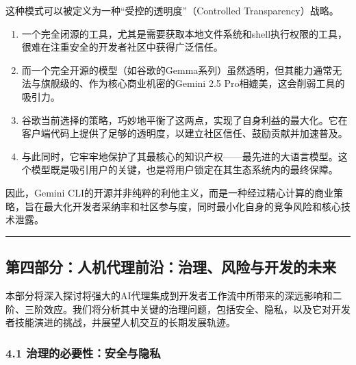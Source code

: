 \documentclass[a4paper,12pt]{article}
\providecommand{\tightlist}{%
  \setlength{\itemsep}{0pt}\setlength{\parskip}{0pt}}
\begin{document}
\begin{multicols}{2}
    这种模式可以被定义为一种``受控的透明度''（Controlled
    Transparency）战略。

    \begin{enumerate}
    \def\labelenumi{\arabic{enumi}.}
    \tightlist
    \item
      一个完全闭源的工具，尤其是需要获取本地文件系统和shell执行权限的工具，很难在注重安全的开发者社区中获得广泛信任。\\
    \item
      而一个完全开源的模型（如谷歌的Gemma系列）虽然透明，但其能力通常无法与旗舰级的、作为核心商业机密的Gemini
      2.5 Pro相媲美，这会削弱工具的吸引力。\\
    \item
      谷歌当前选择的策略，巧妙地平衡了这两点，实现了自身利益的最大化。它在客户端代码上提供了足够的透明度，以建立社区信任、鼓励贡献并加速普及。\\
    \item
      与此同时，它牢牢地保护了其最核心的知识产权------最先进的大语言模型。这个模型既是吸引用户的关键，也是将用户锁定在其生态系统内的最终保障。
    \end{enumerate}

    因此，Gemini
    CLI的开源并非纯粹的利他主义，而是一种经过精心计算的商业策略，旨在最大化开发者采纳率和社区参与度，同时最小化自身的竞争风险和核心技术泄露。

    \begin{center}\rule{0.5\linewidth}{0.5pt}\end{center}

    \subsection{\texorpdfstring{\textbf{第四部分：人机代理前沿：治理、风险与开发的未来}}{第四部分：人机代理前沿：治理、风险与开发的未来}}\label{ux7b2cux56dbux90e8ux5206ux4ebaux673aux4ee3ux7406ux524dux6cbfux6cbbux7406ux98ceux9669ux4e0eux5f00ux53d1ux7684ux672aux6765}

    本部分将深入探讨将强大的AI代理集成到开发者工作流中所带来的深远影响和二阶、三阶效应。我们将分析其中关键的治理问题，包括安全、隐私，以及它对开发者技能演进的挑战，并展望人机交互的长期发展轨迹。

    \subsubsection{\texorpdfstring{\textbf{4.1
    治理的必要性：安全与隐私}}{4.1 治理的必要性：安全与隐私}}\label{ux6cbbux7406ux7684ux5fc5ux8981ux6027ux5b89ux5168ux4e0eux9690ux79c1}


\end{multicols}
\end{document}
